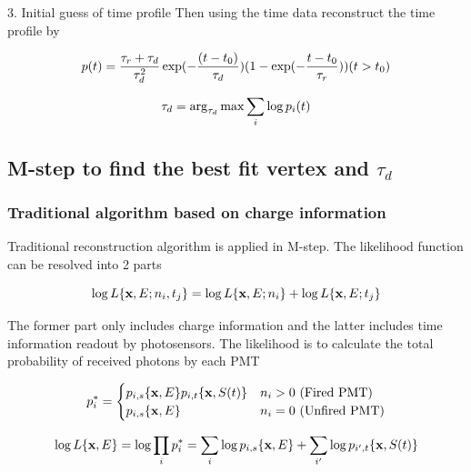 \documentclass{article}
\begin{document}
\par 3. Initial guess of  time profile
	Then using the time data reconstruct the time profile by

	\begin{equation}
		\numberwithin{equation}{section}
		p(t) =  \frac{\tau_r+\tau_d}{\tau_d^2} \exp (-\frac{(t-t_0)}{\tau_d})(1-\exp(-\frac{t-t_0}{\tau_r})) (t > t_0)
	\end{equation}

	\begin{equation}
		\numberwithin{equation}{section}
		\tau_d = \arg_{\tau_d}\max{\sum_i \log p_i(t)}
	\end{equation}

\subsection{M-step to find the best fit vertex and $\tau_d$}
	
\subsubsection{Traditional algorithm based on charge information}

	\par Traditional reconstruction algorithm is applied in M-step. The likelihood function can be resolved into 2 parts
	
	\begin{equation}
		\numberwithin{equation}{section}
		\log L\{\textbf{x},E;n_i,t_j\} = \log L\{\textbf{x},E;n_i\}+\log L\{\textbf{x},E;t_j\}
	\end{equation}
	
	\par  The former part only includes charge information and the latter includes time information readout by photosensors. The likelihood is to calculate the total probability of received photons by each PMT 

	\begin{equation}
	\numberwithin{equation}{section}
	p^*_i =  
		\begin{cases}
 		p_{i,s}\{${\textbf x}$,E\} p_{i,t}\{${\textbf x}$,S(t)\}& \text{$n_i > 0$ (Fired PMT)}\\
 		p_{i,s}\{${\textbf x}$,E\} & \text{$n_i=0$ (Unfired PMT)}
		\end{cases}
	\end{equation}
	
	\begin{equation}
		\numberwithin{equation}{section}
		\log L\{\textbf{x},E\} = \log \prod_{i} p^*_i = 	\sum_{i}\log p_{i,s}\{\textbf{x},E\} +\sum_{i'}\log p_{i',t}\{\textbf{x},S(t)\} 
	\end{equation}
	
\end{document}
